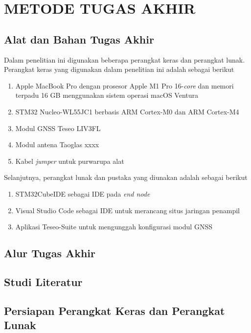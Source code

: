 \chapter{METODE TUGAS AKHIR}

\section{Alat dan Bahan Tugas Akhir}
Dalam penelitian ini digunakan beberapa perangkat keras dan perangkat lunak. Perangkat keras yang digunakan dalam penelitian ini adalah sebagai berikut
\begin{enumerate}
	\item Apple MacBook Pro dengan prosesor Apple M1 Pro 16-\textit{core} dan memori terpadu 16 GB menggunakan sistem operasi macOS Ventura
	\item STM32 Nucleo-WL55JC1 berbasis ARM Cortex-M0 dan ARM Cortex-M4
	\item Modul GNSS Teseo LIV3FL
	\item Modul antena Taoglas xxxx
	\item Kabel \textit{jumper} untuk purwarupa alat
\end{enumerate}
Selanjutnya, perangkat lunak dan pustaka yang diunakan adalah sebagai berikut
\begin{enumerate}
	\item STM32CubeIDE sebagai IDE pada \textit{end node}
	\item Visual Studio Code sebagai IDE untuk merancang situs jaringan penampil
	\item Aplikasi Teseo-Suite untuk mengunggah konfigurasi modul GNSS
\end{enumerate}

\section{Alur Tugas Akhir}

\section{Studi Literatur}

\section{Persiapan Perangkat Keras dan Perangkat Lunak}
